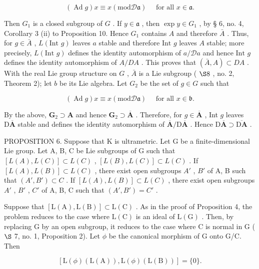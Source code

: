 \[
(\operatorname{Ad} g) x \equiv x (\mathrm{mod} \mathscr {D} \mathfrak {a}) \quad \text { for   all } x \in \mathfrak {a}.
\]

Then \(G_1\) is a closed subgroup of \(G\) . If \(y \in \mathfrak{a}\) , then \(\exp y \in G_1\) , by § 6, no. 4, Corollary 3 (ii) to Proposition 10. Hence \(G_1\) contains \(A\) and therefore \(\bar{A}\) . Thus, for \(g \in \bar{A}\) , \(L(\text{Int } g)\) leaves \(a\) stable and therefore \(\text{Int } g\) leaves \(A\) stable; more precisely, \(L(\text{Int } g)\) defines the identity automorphism of \(a / \mathcal{D}a\) and hence \(\text{Int } g\) defines the identity automorphism of \(A / DA\) . This proves that \((\bar{A}, A) \subset DA\) . With the real Lie group structure on \(G\) , \(\bar{A}\) is a Lie subgroup ( \(\S 8\) , no. 2, Theorem 2); let \(b\) be its Lie algebra. Let \(G_2\) be the set of \(g \in G\) such that

\[
(\operatorname{Ad} g) x \equiv x (\mathrm{mod} \mathscr {D} \mathfrak {a}) \quad \text { for   all } x \in \mathfrak {b}.
\]

By the above, \(\mathbf{G}_2\supset \mathbf{A}\) and hence \(\mathbf{G}_2\supset \overline{\mathbf{A}}\) . Therefore, for \(g\in \overline{\mathbf{A}}\) , Int \(g\) leaves \(\mathrm{D}\overline{\mathbf{A}}\) stable and defines the identity automorphism of \(\overline{\mathbf{A}} / \mathrm{D}\overline{\mathbf{A}}\) . Hence \(\mathrm{D}\overline{\mathbf{A}}\supset \overline{\mathrm{D}\mathbf{A}}\) .

PROPOSITION 6. Suppose that K is ultrametric. Let G be a finite-dimensional Lie group. Let A, B, C be Lie subgroups of G such that \([L(A), L(C)] \subset L(C)\) , \([L(B), L(C)] \subset L(C)\) . If \([L(A), L(B)] \subset L(C)\) , there exist open subgroups \(A'\) , \(B'\) of A, B such that \((A', B') \subset C\) . If \([L(A), L(B)] \subset L(C)\) , there exist open subgroups \(A'\) , \(B'\) , \(C'\) of A, B, C such that \((A', B') = C'\) .

Suppose that \([\mathrm{L}(\mathrm{A}),\mathrm{L}(\mathrm{B})]\subset\mathrm{L}(\mathrm{C})\) . As in the proof of Proposition 4, the problem reduces to the case where \(\mathrm{L}(\mathrm{C})\) is an ideal of \(\mathrm{L}(\mathrm{G})\) . Then, by replacing G by an open subgroup, it reduces to the case where C is normal in G ( \(\S\) 7, no. 1, Proposition 2). Let \(\phi\) be the canonical morphism of G onto G/C. Then

\[
[ \mathrm{L} (\phi) (\mathrm{L} (\mathrm{A})), \mathrm{L} (\phi) (\mathrm{L} (\mathrm{B})) ] = \{0 \}.
\]


